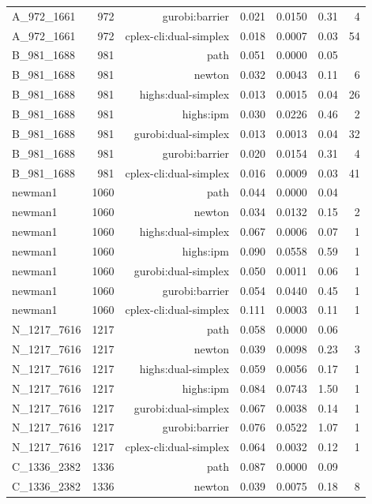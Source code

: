\begin{longtable}{lrrrrrr}
A\_972\_1661 & 972 & gurobi:barrier & 0.021 & 0.0150 & 0.31 & 4 \\
A\_972\_1661 & 972 & cplex-cli:dual-simplex & 0.018 & 0.0007 & 0.03 & 54 \\
B\_981\_1688 & 981 & path & 0.051 & 0.0000 & 0.05 &  \\
B\_981\_1688 & 981 & newton & 0.032 & 0.0043 & 0.11 & 6 \\
B\_981\_1688 & 981 & highs:dual-simplex & 0.013 & 0.0015 & 0.04 & 26 \\
B\_981\_1688 & 981 & highs:ipm & 0.030 & 0.0226 & 0.46 & 2 \\
B\_981\_1688 & 981 & gurobi:dual-simplex & 0.013 & 0.0013 & 0.04 & 32 \\
B\_981\_1688 & 981 & gurobi:barrier & 0.020 & 0.0154 & 0.31 & 4 \\
B\_981\_1688 & 981 & cplex-cli:dual-simplex & 0.016 & 0.0009 & 0.03 & 41 \\
newman1 & 1060 & path & 0.044 & 0.0000 & 0.04 &  \\
newman1 & 1060 & newton & 0.034 & 0.0132 & 0.15 & 2 \\
newman1 & 1060 & highs:dual-simplex & 0.067 & 0.0006 & 0.07 & 1 \\
newman1 & 1060 & highs:ipm & 0.090 & 0.0558 & 0.59 & 1 \\
newman1 & 1060 & gurobi:dual-simplex & 0.050 & 0.0011 & 0.06 & 1 \\
newman1 & 1060 & gurobi:barrier & 0.054 & 0.0440 & 0.45 & 1 \\
newman1 & 1060 & cplex-cli:dual-simplex & 0.111 & 0.0003 & 0.11 & 1 \\
N\_1217\_7616 & 1217 & path & 0.058 & 0.0000 & 0.06 &  \\
N\_1217\_7616 & 1217 & newton & 0.039 & 0.0098 & 0.23 & 3 \\
N\_1217\_7616 & 1217 & highs:dual-simplex & 0.059 & 0.0056 & 0.17 & 1 \\
N\_1217\_7616 & 1217 & highs:ipm & 0.084 & 0.0743 & 1.50 & 1 \\
N\_1217\_7616 & 1217 & gurobi:dual-simplex & 0.067 & 0.0038 & 0.14 & 1 \\
N\_1217\_7616 & 1217 & gurobi:barrier & 0.076 & 0.0522 & 1.07 & 1 \\
N\_1217\_7616 & 1217 & cplex-cli:dual-simplex & 0.064 & 0.0032 & 0.12 & 1 \\
C\_1336\_2382 & 1336 & path & 0.087 & 0.0000 & 0.09 &  \\
C\_1336\_2382 & 1336 & newton & 0.039 & 0.0075 & 0.18 & 8 \\

\end{longtable}
